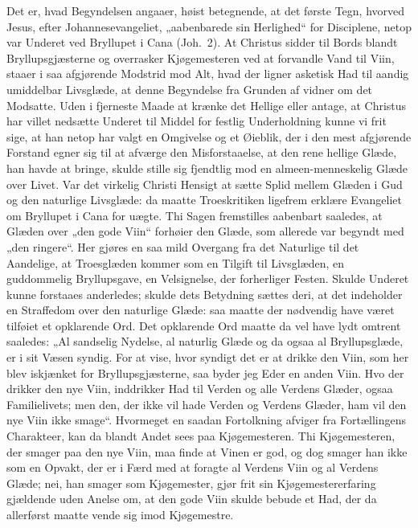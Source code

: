 \documentclass[12pt]{book}
\begin{document}
Det er, hvad Begyndelsen angaaer, høist betegnende, at det første
Tegn, hvorved Jesus, efter Johannesevangeliet, „aabenbarede sin
Herlighed“ for Disciplene, netop var Underet ved Bryllupet i Cana
(Joh.\ 2). At Christus sidder til Bords blandt Bryllupsgjæsterne og
overrasker Kjøgemesteren ved at forvandle Vand til Viin, staaer i
saa afgjørende Modstrid mod Alt, hvad der ligner asketisk Had til
aandig umiddelbar Livsglæde, at denne Begyndelse fra Grunden af
vidner om det Modsatte. Uden i fjerneste Maade at krænke det Hellige
eller antage, at Christus har villet nedsætte Underet til Middel for
festlig Underholdning kunne vi frit sige, at han netop har valgt en
Omgivelse og et Øieblik, der i den mest afgjørende Forstand egner
sig til at afværge den Misforstaaelse, at den rene hellige Glæde,
han havde at bringe, skulde stille sig fjendtlig mod en
almeen-menneskelig Glæde over Livet. Var det virkelig Christi
Hensigt at sætte Splid mellem Glæden i Gud og den naturlige
Livsglæde: da maatte Troeskritiken ligefrem erklære Evangeliet om
Bryllupet i Cana for uægte. Thi Sagen fremstilles aabenbart
saaledes, at Glæden over „den gode Viin“ forhøier den Glæde, som
allerede var begyndt med „den ringere“. Her gjøres en saa mild
Overgang fra det Naturlige
til det Aandelige, at Troesglæden kommer som en Tilgift til
Livsglæden, en guddommelig Bryllupsgave, en Velsignelse, der
forherliger Festen. Skulde Underet kunne forstaaes anderledes;
skulde dets Betydning sættes deri, at det indeholder en Straffedom
over den naturlige Glæde: saa maatte der nødvendig have været
tilføiet et opklarende Ord. Det opklarende Ord maatte da vel have
lydt omtrent saaledes: „Al sandselig Nydelse, al naturlig Glæde og
da ogsaa al Bryllupsglæde, er i sit Væsen syndig. For at vise, hvor
syndigt det er at drikke den Viin, som her blev iskjænket for
Bryllupsgjæsterne, saa byder jeg Eder en anden Viin. Hvo der drikker
den nye Viin, inddrikker Had til Verden og alle Verdens Glæder,
ogsaa Familielivets; men den, der ikke vil hade Verden og Verdens
Glæder, ham vil den nye Viin ikke smage“. Hvormeget en saadan
Fortolkning afviger fra Fortællingens Charakteer, kan da blandt
Andet sees paa Kjøgemesteren. Thi Kjøgemesteren, der smager paa den
nye Viin, maa finde at Vinen er god, og dog smager han ikke som en
Opvakt, der er i Færd med at foragte al Verdens Viin og al Verdens
Glæde; nei, han smager som Kjøgemester, gjør frit sin
Kjøgemestererfaring gjældende uden Anelse om, at den gode Viin
skulde bebude et Had, der da allerførst maatte vende sig imod
Kjøgemestre.
\end{document}
